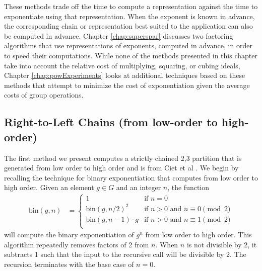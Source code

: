 \documentclass{ucalgthes1}
\theoremstyle{definition}
\begin{document}
These methods trade off the time to compute a representation against the time to exponentiate using that representation.  When the exponent is known in advance, the corresponding chain or representation best suited to the application can also be computed in advance.  Chapter \ref{chap:superspar} discusses two factoring algorithms that use representations of exponents, computed in advance, in order to speed their computations.  While none of the methods presented in this chapter take into account the relative cost of multiplying, squaring, or cubing ideals, Chapter \ref{chap:powExperiments} looks at additional techniques based on these methods that attempt to minimize the cost of exponentiation given the average costs of group operations.  

\subsection{Right-to-Left Chains (from low-order to high-order)}
\label{subsec:rtolChains}

The first method we present computes a strictly chained 2,3 partition that is generated from low order to high order and is from Ciet et al \cite[Figure 8]{Ciet2006}.  We begin by recalling the technique for binary exponentiation that computes from low order to high order.  Given an element $g \in G$ and an integer $n$, the function
\begin{align*}
\textrm{bin}(g, n) &= \begin{cases}
               1 & \textrm{if $n = 0$} \\
               {\textrm{bin}(g, n/2)}^2 & \textrm{if $n > 0$ and $n \equiv 0 \pmod 2$} \\
               \textrm{bin}(g, n-1) \cdot g & \textrm{if $n > 0$ and $n \equiv 1 \pmod 2$} \\
	       \end{cases}
\end{align*}
will compute the binary exponentiation of $g^n$ from low order to high order. This algorithm repeatedly removes factors of 2 from $n$.  When $n$ is not divisible by 2, it subtracts 1 such that the input to the recursive call will be divisible by 2.  The recursion terminates with the base case of $n=0$.
\end{document}
